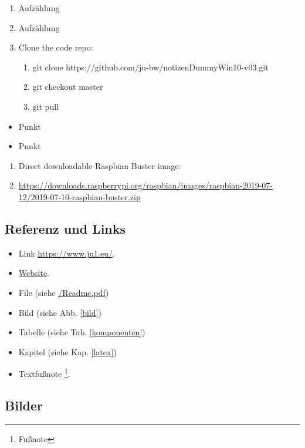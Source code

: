 \begin{enumerate}
	\item Aufzählung
	\item Aufzählung
	\item Clone the code repo:
	\begin{enumerate}
		\item git clone https://github.com/ju-bw/notizenDummyWin10-v03.git 
		\item git checkout master
		\item git pull
	\end{enumerate}
\end{enumerate}

\begin{itemize}
	\item Punkt
	\item Punkt
\end{itemize}

\begin{enumerate}
	\item[] Direct downloadable Raspbian Buster image: 
	\item[] \href{https://downloads.raspberrypi.org/raspbian/images/raspbian-2019-07-12/2019-07-10-raspbian-buster.zip}{https://downloads.raspberrypi.org/raspbian/images/raspbian-2019-07-12/2019-07-10-raspbian-buster.zip}
\end{enumerate}


\subsection{Referenz und Links}
\label{referenz_links}

\begin{itemize}
	\item Link \href{https://www.ju1.eu/}{https://www.ju1.eu/}.
	\item \href{https://www.ju1.eu/}{Website}.
	\item File (siehe \href{https://github.com/ju-bw/dummy-Notiz-Win10-v03/Readme.pdf}{/Readme.pdf})
	\item Bild (siehe Abb. \ref{bild})
	\item Tabelle (siehe Tab. \ref{komponenten})
	\item Kapitel (siehe Kap. \ref{latex})
	\item Textfußnote \footnote{Fußnote}.
\end{itemize}


\subsection{Bilder}
\label{bilder}

